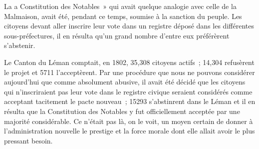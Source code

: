 \documentclass[french,twoside]{book} %
\begin{document}
\noindent La a Constitution des Notables » qui avait quelque analogie avec celle de la Malmaison, avait été, pendant ce temps, soumise à la sanction du peuple. Les citoyens devant aller inscrire leur vote dans un registre déposé dans les différentes sous-préfectures, il en résulta qu’un grand nombre d’entre eux préférèrent s’abstenir.\par
Le Canton du Léman comptait, en 1802, 35,308 citoyens actifs ; 14,304 refusèrent le projet et 5711 l’acceptèrent. Par une procédure que nous ne pouvons considérer aujourd’hui que comme absolument abusive, il avait été décidé que les citoyens qui n’inscriraient pas leur vote dans le registre civique seraient considérés comme acceptant tacitement le pacte nouveau ; 15293 s’abstinrent dans le Léman et il en résulta que la Constitution des Notables y fut officiellement acceptée par une majorité considérable. Ce n’était pas là, on le voit, un moyen certain de donner à l’administration nouvelle le prestige et la force morale dont elle allait avoir le plus pressant besoin.
\end{document}
